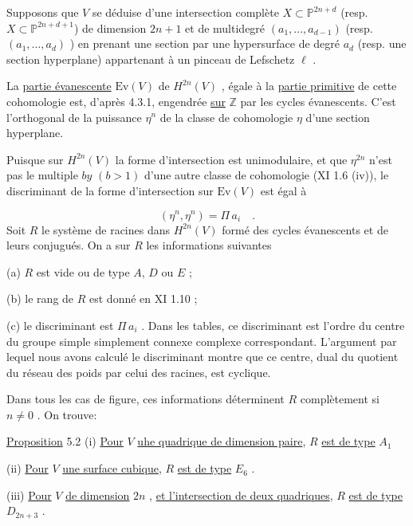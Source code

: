 Supposons que $V$ se déduise d'une intersection complète $X \subset \mathbb{P}^{2n+d}$ (resp. $X \subset \mathbb{P}^{2n+d+1}$) de dimension $2n + 1$ et de multidegré $(a_1,\ldots,a_{d-1})$ (resp. $(a_1,\ldots,a_d)$ ) en prenant une section par une hypersurface de degré $a_d$ (resp. une section hyperplane) appartenant à un pinceau de Lefschetz $\ell$ .

La \underline{partie évanescente} $\mathrm{Ev}(V)$ de $H^{2n}(V)$ , égale à la \underline{partie primitive} de cette cohomologie est, d'après 4.3.1, engendrée \underline{sur} $\mathbb{Z}$ par les cycles évanescents. C'est l'orthogonal de la puissance $\eta^n$ de la classe de cohomologie $\eta$ d'une section hyperplane.

Puisque sur $H^{2n}(V)$ la forme d'intersection est unimodulaire, et que $\eta^{2n}$ n'est pas le multiple $by$ $(b > 1)$ d'une autre classe de cohomologie (XI 1.6 (iv)), le discriminant de la forme d'intersection sur $\mathrm{Ev}(V)$ est égal à

\begin{equation*}
(\eta^n, \eta^n) = \Pi\, a_i \quad .
\end{equation*}
Soit $R$ le système de racines dans $H^{2n}(V)$ formé des cycles évanescents et de leurs conjugués. On a sur $R$ les informations suivantes

(a) \quad $R$ est vide ou de type $A$, $D$ ou $E$ ;

(b) \quad le rang de $R$ est donné en XI 1.10 ;

(c) \quad le discriminant est $\Pi\, a_i$ . Dans les tables, ce discriminant est l'ordre du centre du groupe simple simplement connexe complexe correspondant. L'argument par lequel nous avons calculé le discriminant montre que ce centre, dual du quotient du réseau des poids par celui des racines, est cyclique.



Dans tous les cas de figure, ces informations déterminent $R$ complètement si $n \neq 0$ . On trouve:

\underline{Proposition} 5.2 \quad (i) \underline{Pour} $V$ \underline{uhe quadrique de dimension paire}, $R$ \underline{est de type} $A_1$

(ii) \underline{Pour} $V$ \underline{une surface cubique}, $R$ \underline{est de type} $E_6$ .

(iii) \underline{Pour} $V$ \underline{de dimension} $2n$ , \underline{et l'intersection de deux quadriques}, $R$ \underline{est de type} $D_{2n+3}$ .

